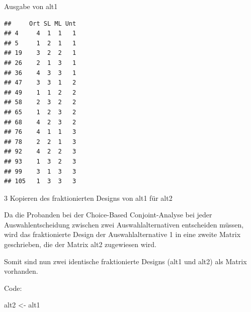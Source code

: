 \documentclass[12pt,ngerman,a4paper,ignorenonframetext,]{beamer}
\newenvironment{Shaded}{\begin{snugshade}}{\end{snugshade}}
\newcommand{\NormalTok}[1]{#1}
\newcommand{\StringTok}[1]{\textcolor[rgb]{0.31,0.60,0.02}{#1}}
\begin{document}
\begin{frame}[fragile]{Ausgabe von alt1}
\protect\hypertarget{ausgabe-von-alt1}{}

\begin{verbatim}
##     Ort SL ML Unt
## 4     4  1  1   1
## 5     1  2  1   1
## 19    3  2  2   1
## 26    2  1  3   1
## 36    4  3  3   1
## 47    3  3  1   2
## 49    1  1  2   2
## 58    2  3  2   2
## 65    1  2  3   2
## 68    4  2  3   2
## 76    4  1  1   3
## 78    2  2  1   3
## 92    4  2  2   3
## 93    1  3  2   3
## 99    3  1  3   3
## 105   1  3  3   3
\end{verbatim}

\end{frame}

\begin{frame}[fragile]{3 Kopieren des fraktionierten Designs von alt1
für alt2}
\protect\hypertarget{kopieren-des-fraktionierten-designs-von-alt1-fur-alt2}{}

Da die Probanden bei der Choice-Based Conjoint-Analyse bei jeder
Auswahlentscheidung zwischen zwei Auswahlalternativen entscheiden
müssen, wird das fraktionierte Design der Auswahlalternative 1 in eine
zweite Matrix geschrieben, die der Matrix alt2 zugewiesen wird.

Somit sind nun zwei identische fraktionierte Designs (alt1 und alt2) als
Matrix vorhanden.

Code:

\begin{Shaded}
\begin{Highlighting}[]
\NormalTok{alt2 <-}\StringTok{ }\NormalTok{alt1}
\end{Highlighting}
\end{Shaded}

\end{frame}
\end{document}
